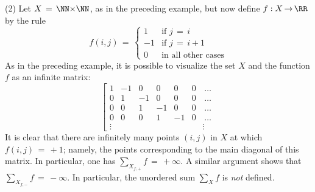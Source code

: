         (2) Let $X \,=\, {\NN}{\times}{\NN}$, as in the preceding example, but now define $f:X \,{\rightarrow}\, {\RR}$ by the rule
        \begin{displaymath}
        f(i,j) \,=\, \left\{
                \begin{array}{rl}
        1 & \mbox{if $j \,=\, i$}   \\
       -1 & \mbox{if $j \,=\, i+1$} \\
        0 & \mbox{in all other cases}
        \end{array}
                                \right.
        \end{displaymath}
    As in the preceding example, it is possible to visualize the set $X$ and the function $f$ as an infinite matrix:
        \begin{equation}
        \label{MatrixG.40}
        \left[
        \begin{array}{rrrrrrc}
        1 & -1 &  0 &  0 &  0 & 0 & \,{\ldots}\, \\
        0 &  1 & -1 &  0 &  0 & 0 & \,{\ldots}\, \\
        0 &  0 &  1 & -1 &  0 & 0 & \,{\ldots}\, \\
        0 &  0 &  0 &  1 & -1 & 0 & \,{\ldots}\, \\
 {\vdots} &    &    &    &    &   & {\vdots}
        \end{array}
                \right.
        \end{equation}
    It is clear that there are infinitely many points $(i,j)$ in $X$ at which $f(i,j) \,=\, +1$; namely, the points corresponding to the main diagonal of this matrix.
    In particular, one has ${\sum}_{X_{f;+}} f \,=\, +{\infty}$.
    A similar argument shows that ${\sum}_{X_{f;-}} f \,=\, -{\infty}$.
    In particular, the unordered sum ${\sum}_{X} f$ is {\em not} defined.

